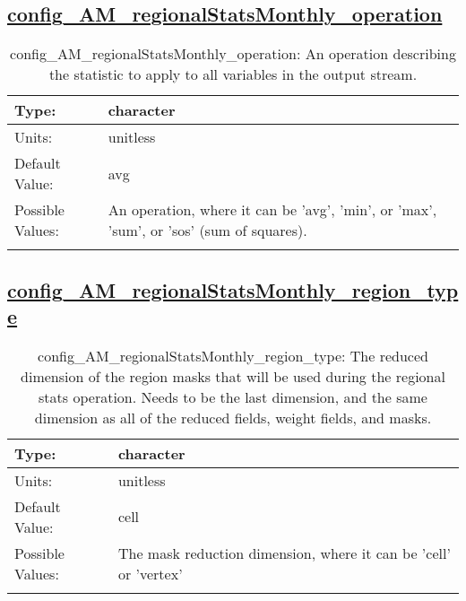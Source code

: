 \subsection[config\_AM\_regionalStatsMonthly\_operation]{\hyperref[sec:nm_tab_AM_regionalStatsMonthly]{config\_AM\_regionalStatsMonthly\_operation}}
\label{subsec:nm_sec_config_AM_regionalStatsMonthly_operation}
\begin{center}
\begin{longtable}{| p{2.0in} || p{4.0in} |}
    \hline
    Type: & character \\
    \hline
    Units: & \si{unitless} \\
    \hline
    Default Value: & avg \\
    \hline
    Possible Values: & An operation, where it can be 'avg', 'min', or 'max', 'sum', or 'sos' (sum of squares). \\
    \hline
    \caption{config\_AM\_regionalStatsMonthly\_operation: An operation describing the statistic to apply to all variables in the output stream.}
\end{longtable}
\end{center}
\subsection[config\_AM\_regionalStatsMonthly\_region\_type]{\hyperref[sec:nm_tab_AM_regionalStatsMonthly]{config\_AM\_regionalStatsMonthly\_region\_type}}
\label{subsec:nm_sec_config_AM_regionalStatsMonthly_region_type}
\begin{center}
\begin{longtable}{| p{2.0in} || p{4.0in} |}
    \hline
    Type: & character \\
    \hline
    Units: & \si{unitless} \\
    \hline
    Default Value: & cell \\
    \hline
    Possible Values: & The mask reduction dimension, where it can be 'cell' or 'vertex' \\
    \hline
    \caption{config\_AM\_regionalStatsMonthly\_region\_type: The reduced dimension of the region masks that will be used during the regional stats operation. Needs to be the last dimension, and the same dimension as all of the reduced fields, weight fields, and masks.}
\end{longtable}
\end{center}
